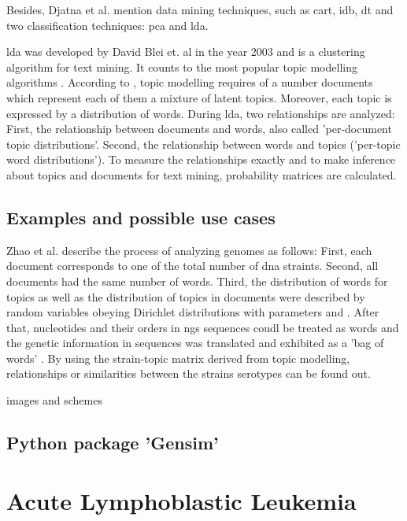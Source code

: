Besides, Djatna et al. \autocite{djatna_2018} mention data mining techniques, such as \gls{cart}, \gls{idb}, \gls{dt} and two classification techniques: \gls{pca} and \gls{lda}. 

\gls{lda} was developed by David Blei et. al in the year 2003 and is a clustering algorithm for text mining. It counts to the most popular topic modelling algorithms \autocite{zhao_2016}.
According to \autocite{zhao_2016}, topic modelling requires of a number documents which represent each of them a mixture of latent topics. Moreover, each topic is expressed by a distribution of words. During \gls{lda}, two relationships are analyzed: First, the relationship between documents and words, also called 'per-document topic distributions'. Second, the relationship between words and topics ('per-topic word distributions'). To measure the relationships exactly and to make inference about topics and documents for text mining, probability matrices are calculated.
 
\section{Examples and possible use cases}\label{lda_examples}

Zhao et al. describe the process of analyzing genomes as follows: First, each document corresponds to one of the total number of \gls{dna} straints. Second, all documents had the same number of words. Third, the distribution of words for topics as well as the distribution of topics in documents were described by random variables obeying Dirichlet distributions with parameters \alpha and \beta. After that, nucleotides and their orders in \gls{ngs} sequences coudl be treated as words and the genetic information in sequences was translated and exhibited as a 'bag of words'  \autocite{zhao_2016}. By using the strain-topic matrix derived from topic modelling, relationships or similarities between the strains serotypes can be found out. 
 
images and schemes
\section{Python package 'Gensim'}\label{gensim}
              
\chapter{Acute Lymphoblastic Leukemia}\label{all}
